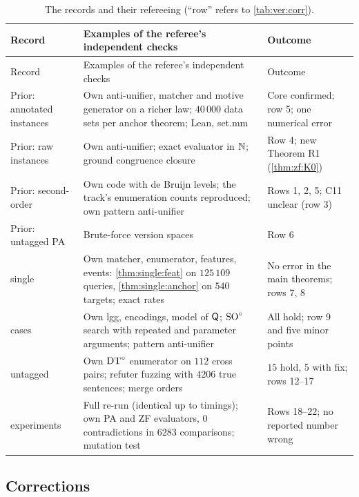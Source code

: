 \begingroup\footnotesize
\setlength{\tabcolsep}{4pt}
\setlength{\LTpre}{6pt}\setlength{\LTpost}{2pt}
\begin{longtable}{@{}>{\raggedright\arraybackslash}p{}>{\raggedright\arraybackslash}p{}>{\raggedright\arraybackslash}p{}@{}}
\caption{The records and their refereeing (``row'' refers to \cref{tab:ver:corr}).}\label{tab:ver:tracks}\\
\toprule
Record & Examples of the referee's independent checks & Outcome\\
\midrule
\endfirsthead
\toprule
Record & Examples of the referee's independent checks & Outcome\\
\midrule
\endhead
\bottomrule
\endfoot
Prior: annotated instances &
Own anti-unifier, matcher and motive generator on a richer law; $40\,000$ data sets per anchor theorem; Lean, set.mm &
Core confirmed; row 5; one numerical error\\
Prior: raw instances &
Own anti-unifier; exact evaluator in $\mathbb{N}$; ground congruence closure &
Row 4; new Theorem R1 (\cref{thm:zf:K0})\\
Prior: second-order &
Own code with de Bruijn levels; the track's enumeration counts reproduced; own pattern anti-unifier &
Rows 1, 2, 5; C11 unclear (row 3)\\
Prior: untagged PA &
Brute-force version spaces &
Row 6\\
single &
Own matcher, enumerator, features, events: \cref{thm:single:feat} on $125\,109$ queries, \cref{thm:single:anchor} on
$540$ targets; exact rates &
No error in the main theorems; rows 7, 8\\
cases &
Own lgg, encodings, model of $\mathsf{Q}$; $\mathrm{SO}^{\circ}$ search with repeated and parameter arguments; pattern anti-unifier &
All hold; row 9 and five minor points\\
untagged &
Own $\mathrm{DT}^{\circ}$ enumerator on $112$ cross pairs; refuter fuzzing with $4206$ true sentences; merge orders &
$15$ hold, $5$ with fix; rows 12--17\\
experiments &
Full re-run (identical up to timings); own PA and ZF evaluators, $0$ contradictions in $6283$ comparisons;
mutation test &
Rows 18--22; no reported number wrong\\
\end{longtable}
\endgroup

\subsection{Corrections}\label{app:ver:corr}


